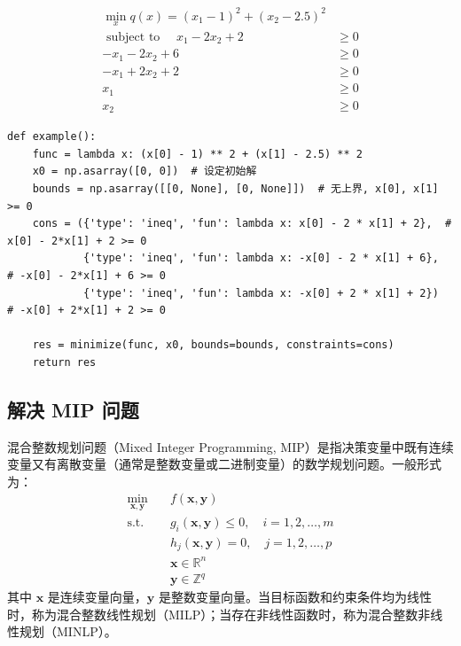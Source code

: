 \begin{example}
    $$
        \begin{aligned}
            \min _x q(x)=\left(x_1-1\right)^2+\left(x_2-2.5\right)^2 &        \\
            \text { subject to } \quad x_1-2 x_2+2                   & \geq 0 \\
            -x_1-2 x_2+6                                             & \geq 0 \\
            -x_1+2 x_2+2                                             & \geq 0 \\
            x_1                                                      & \geq 0 \\
            x_2                                                      & \geq 0
        \end{aligned}
    $$
\end{example}

\begin{lstlisting}[style=python]
def example():
    func = lambda x: (x[0] - 1) ** 2 + (x[1] - 2.5) ** 2
    x0 = np.asarray([0, 0])  # 设定初始解
    bounds = np.asarray([[0, None], [0, None]])  # 无上界, x[0], x[1] >= 0
    cons = ({'type': 'ineq', 'fun': lambda x: x[0] - 2 * x[1] + 2},  # x[0] - 2*x[1] + 2 >= 0
            {'type': 'ineq', 'fun': lambda x: -x[0] - 2 * x[1] + 6},  # -x[0] - 2*x[1] + 6 >= 0
            {'type': 'ineq', 'fun': lambda x: -x[0] + 2 * x[1] + 2})  # -x[0] + 2*x[1] + 2 >= 0

    res = minimize(func, x0, bounds=bounds, constraints=cons)
    return res
\end{lstlisting}

\subsection{解决 MIP 问题}

\begin{definition}[MIP 问题]
    混合整数规划问题（Mixed Integer Programming, MIP）是指决策变量中既有连续变量又有离散变量（通常是整数变量或二进制变量）的数学规划问题。一般形式为：
    $$
        \begin{aligned}
            \min_{\mathbf{x}, \mathbf{y}} \quad & f(\mathbf{x}, \mathbf{y})                                \\
            \text{s.t.} \quad                   & g_i(\mathbf{x}, \mathbf{y}) \leq 0, \quad i=1,2,\ldots,m \\
                                                & h_j(\mathbf{x}, \mathbf{y}) = 0, \quad j=1,2,\ldots,p    \\
                                                & \mathbf{x} \in \mathbb{R}^n                              \\
                                                & \mathbf{y} \in \mathbb{Z}^q
        \end{aligned}
    $$
    其中 $\mathbf{x}$ 是连续变量向量，$\mathbf{y}$ 是整数变量向量。当目标函数和约束条件均为线性时，称为混合整数线性规划（MILP）；当存在非线性函数时，称为混合整数非线性规划（MINLP）。
\end{definition}

